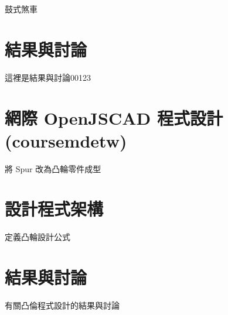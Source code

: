 \documentclass[]{article}
\begin{document}
鼓式煞車

\section{結果與討論}\label{ux7d50ux679cux8207ux8a0eux8ad6-12}

這裡是結果與討論00123

\section{網際 OpenJSCAD
程式設計(coursemdetw)}\label{ux7db2ux969b-openjscad-ux7a0bux5f0fux8a2dux8a08coursemdetw}

將 Spur 改為凸輪零件成型

\section{設計程式架構}\label{ux8a2dux8a08ux7a0bux5f0fux67b6ux69cb}

定義凸輪設計公式

\section{結果與討論}\label{ux7d50ux679cux8207ux8a0eux8ad6-13}

有關凸倫程式設計的結果與討論
\end{document}
